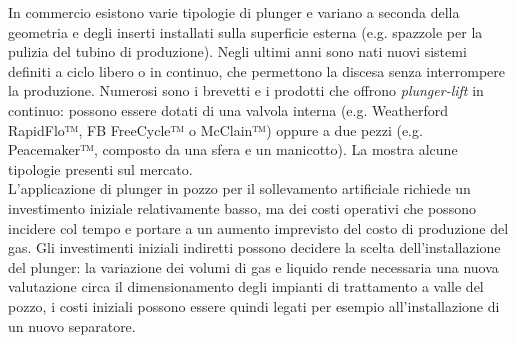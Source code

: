 In commercio esistono varie tipologie di plunger e variano a seconda della geometria e degli inserti installati sulla superficie esterna (e.g. spazzole per la pulizia del tubino di produzione). Negli ultimi anni sono nati nuovi sistemi definiti a ciclo libero o in continuo, che permettono la discesa senza interrompere la produzione. Numerosi sono i brevetti e i prodotti che offrono \textit{plunger-lift} in continuo: possono essere dotati di una valvola interna (e.g. Weatherford RapidFlo™, FB FreeCycle™ o McClain™) oppure a due pezzi (e.g. Peacemaker™, composto da una sfera e un manicotto). La  mostra alcune tipologie presenti sul mercato.\\
L'applicazione di plunger in pozzo per il sollevamento artificiale richiede un investimento iniziale relativamente basso, ma dei costi operativi che possono incidere col tempo e portare a un aumento imprevisto del costo di produzione del gas. Gli investimenti iniziali indiretti possono decidere la scelta dell'installazione del plunger: la variazione dei volumi di gas e liquido rende necessaria una nuova valutazione circa il dimensionamento degli impianti di trattamento a valle del pozzo, i costi iniziali possono essere quindi legati per esempio all'installazione di un nuovo separatore.

